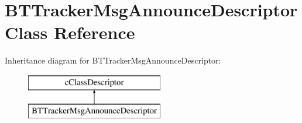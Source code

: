 \hypertarget{classBTTrackerMsgAnnounceDescriptor}{}\section{B\+T\+Tracker\+Msg\+Announce\+Descriptor Class Reference}
\label{classBTTrackerMsgAnnounceDescriptor}
Inheritance diagram for B\+T\+Tracker\+Msg\+Announce\+Descriptor\+:\begin{figure}[H]
\begin{center}
\leavevmode
\includegraphics[height=2.000000cm]{classBTTrackerMsgAnnounceDescriptor}
\end{center}
\end{figure}
